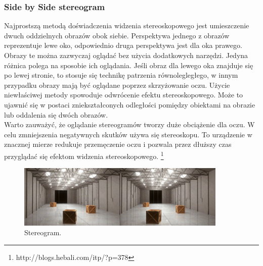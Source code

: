 \subsubsection{Side by Side stereogram}
Najprostszą metodą doświadczenia widzenia stereoskopowego jest umieszczenie dwuch oddzielnych obrazów obok siebie. Perspektywa jednego z obrazów reprezentuje lewe oko, odpowiednio druga perspektywa jest dla oka prawego. Obrazy te można zazwyczaj oglądać bez użycia dodatkowych narzędzi. Jedyna różnica polega na sposobie ich oglądania. Jeśli obraz dla lewego oka znajduje się po lewej stronie, to stosuje się technikę patrzenia równolegległego, w innym przypadku obrazy mają być oglądane poprzez skrzyżowanie oczu. Użycie niewłaściwej metody spowoduje odwrócenie efektu stereoskopowego. Może to ujawnić się w postaci zniekształconych odległości pomiędzy obiektami na obrazie lub oddalenia się dwóch obrazów. \\
Warto zauważyć, że oglądanie stereogramów tworzy duże obciążenie dla oczu. W celu zmniejszenia negatywnych skutków używa się stereoskopu. To urządzenie w znacznej mierze redukuje przemęczenie oczu i pozwala przez dłuższy czas przyglądać się efektom widzenia stereoskopowego.
\footnote{http://blogs.hebali.com/itp/?p=378}
\begin{figure}[H]
		\centering
 		\includegraphics[width=10cm]{sbs.jpg}
    	\caption{Stereogram.}
 		\label{rys1}
\end{figure}


